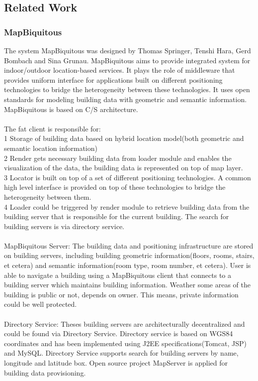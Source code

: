 \documentclass[12pt,oneside,a4paper]{article}
\begin{document}
\subsection{\large Related Work}
\subsubsection{MapBiquitous}
The system MapBiquitous was designed by Thomas Springer, Tenshi Hara, Gerd Bombach and Sina Grunau. MapBiquitous aims to provide integrated system for indoor/outdoor location-based services. It plays the role of middleware that  provides uniform interface for applications built on different positioning technologies to bridge the heterogeneity between these technologies. It uses open standards for modeling building data with geometric and semantic information. MapBiquitous is based on C/S architecture.\\\\ 
The fat client is responsible for: \\
1 Storage of building data based on hybrid location model(both geometric and semantic location information)\\ 
2 Render gets necessary building data from loader module and enables the visualization of the data, the building data is represented on top of map layer.\\
3 Locator is built on top of a set of different positioning technologies. A common high level interface is provided on top of these technologies to bridge the heterogeneity between them.\\
4 Loader could be triggered by render module to retrieve building data from the building server that is responsible for the current building. The search for building servers is via directory service.\\\\
MapBiquitous Server: The building data and positioning infrastructure are stored on building servers, including building geometric information(floors, rooms, stairs, et cetera) and semantic information(room type, room number, et cetera). User is able to navigate a building using a MapBiquitous client that connects to a building server which maintains building information. Weather some areas of the building is public or not, depends on owner. This means, private information could be well protected.\\\\
Directory Service: Theses building servers are architecturally decentralized and could be found via Directory Service. Directory service is based on WGS84 coordinates and has been implemented using J2EE specifications(Tomcat, JSP) and MySQL. Directory Service supports search for building servers by name, longitude and latitude box. Open source project MapServer is applied for building data provisioning.\\
\end{document}
